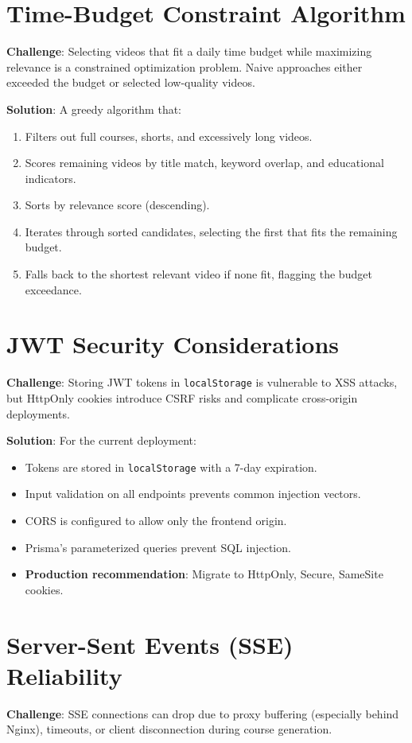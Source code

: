 \documentclass[12pt,a4paper]{report}
\begin{document}
\section{Time-Budget Constraint Algorithm}
\textbf{Challenge}: Selecting videos that fit a daily time budget while maximizing relevance is a constrained optimization problem. Naive approaches either exceeded the budget or selected low-quality videos.

\textbf{Solution}: A greedy algorithm that:
\begin{enumerate}[noitemsep]
    \item Filters out full courses, shorts, and excessively long videos.
    \item Scores remaining videos by title match, keyword overlap, and educational indicators.
    \item Sorts by relevance score (descending).
    \item Iterates through sorted candidates, selecting the first that fits the remaining budget.
    \item Falls back to the shortest relevant video if none fit, flagging the budget exceedance.
\end{enumerate}

\section{JWT Security Considerations}
\textbf{Challenge}: Storing JWT tokens in \texttt{localStorage} is vulnerable to XSS attacks, but HttpOnly cookies introduce CSRF risks and complicate cross-origin deployments.

\textbf{Solution}: For the current deployment:
\begin{itemize}[noitemsep]
    \item Tokens are stored in \texttt{localStorage} with a 7-day expiration.
    \item Input validation on all endpoints prevents common injection vectors.
    \item CORS is configured to allow only the frontend origin.
    \item Prisma's parameterized queries prevent SQL injection.
    \item \textbf{Production recommendation}: Migrate to HttpOnly, Secure, SameSite cookies.
\end{itemize}

\section{Server-Sent Events (SSE) Reliability}
\textbf{Challenge}: SSE connections can drop due to proxy buffering (especially behind Nginx), timeouts, or client disconnection during course generation.
\end{document}
